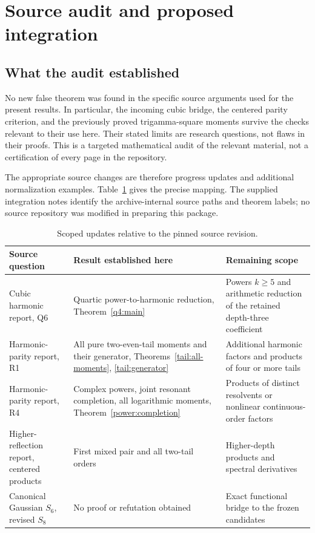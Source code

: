 \section{Source audit and proposed integration}
\label{audit:section}

\subsection{What the audit established}

No new false theorem was found in the specific source arguments used
for the present results. In particular, the incoming cubic bridge,
the centered parity criterion, and the previously proved
trigamma-square moments survive the checks relevant to their use
here. Their stated limits are research questions, not flaws in
their proofs. This is a targeted mathematical audit of the relevant
material, not a certification of every page in the repository.

The appropriate source changes are therefore progress updates and
additional normalization examples. Table~\ref{audit:status-table}
gives the precise mapping. The supplied integration notes identify
the archive-internal source paths and theorem labels; no source
repository was modified in preparing this package.

\begin{table}[htbp]
\centering\small
\begin{tabular}{@{}>{\raggedright\arraybackslash}p{.28\linewidth}>{\raggedright\arraybackslash}p{.36\linewidth}>{\raggedright\arraybackslash}p{.28\linewidth}@{}}
\toprule
Source question & Result established here & Remaining scope\\
\midrule
Cubic harmonic report, Q6 & Quartic power-to-harmonic reduction,
Theorem~\ref{q4:main} & Powers $k\ge5$ and arithmetic reduction of
the retained depth-three coefficient\\[5pt]
Harmonic-parity report, R1 & All pure two-even-tail moments and their
generator, Theorems~\ref{tail:all-moments}, \ref{tail:generator}
& Additional harmonic factors and products of four or more tails\\[5pt]
Harmonic-parity report, R4 & Complex powers, joint resonant completion,
all logarithmic moments, Theorem~\ref{power:completion}
& Products of distinct resolvents or nonlinear continuous-order factors\\[5pt]
Higher-reflection report, centered products & First mixed pair and all
two-tail orders & Higher-depth products and spectral derivatives\\[5pt]
Canonical Gaussian $S_6$, revised $S_8$ & No proof or refutation obtained
& Exact functional bridge to the frozen candidates\\
\bottomrule
\end{tabular}
\caption{Scoped updates relative to the pinned source revision.}
\label{audit:status-table}
\end{table}

